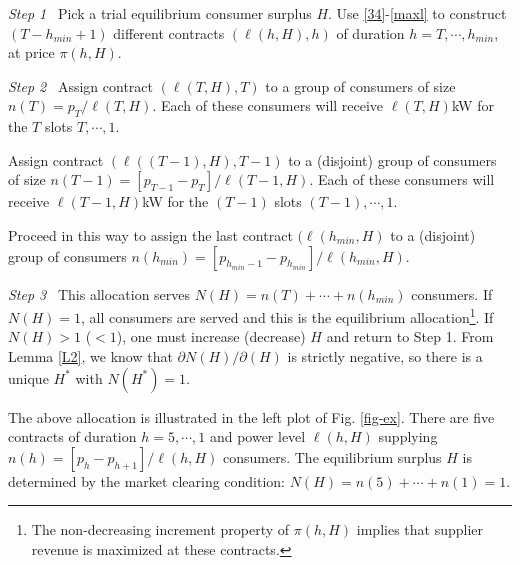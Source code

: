 \documentclass[10pt,draftcls,onecolumn]{IEEEtran}
\newcounter{l1}
\newcounter{l2}
\newcounter{l3}
\renewcommand{\hm}{h_{min}}
\begin{document}
\textit{Step 1} \
Pick a trial equilibrium consumer surplus $H$.  Use \eqref{34}-\eqref{maxl} to   construct $(T-\hm +1)$ different contracts $(\ell (h, H), h)$ of duration $h=T, \cdots, \hm$, at price $\pi (h,H)$.

\textit{Step 2} \
Assign contract $(\ell (T, H), T)$ to a group of consumers of size $n(T) = p_T / \ell(T,H)$.  Each of these consumers will receive $\ell (T,H)$kW
for the $T$ slots $T, \cdots, 1$.

Assign contract $(\ell( (T-1),H),T-1)$ to a (disjoint) group of consumers of size $n(T-1) = [p_{T-1} -p_T]/\ell(T-1, H)$.  Each of these consumers will receive $\ell (T-1,H)$kW
for the $(T-1)$ slots $(T-1), \cdots, 1$.

Proceed in this way to assign the last contract $(\ell(\hm, H)$ to a (disjoint) group of consumers $n(\hm) = [p_{\hm -1} - p_{\hm }]
/\ell (\hm, H)$.

\textit{Step 3}  \ This allocation serves $N(H) = n(T) + \cdots + n(\hm)$ consumers.  If $N(H) = 1$, all consumers are served and this
is the equilibrium allocation\footnote{The non-decreasing increment property of $\pi(h,H)$ implies that supplier revenue is maximized at these contracts.}.  If $N(H) > 1$ ($< 1$), one must increase (decrease) $H$ and return to Step 1.  From Lemma \ref{L2},
we know that $\partial N(H) /\partial (H) $ is strictly negative, so there is a unique $H^*$ with $N(H^*) = 1$.


The above allocation is illustrated in the  left plot of Fig. \ref{fig-ex}. There are five contracts of duration $h = 5, \cdots, 1$ and
power level $\ell(h, H) $ supplying $n(h) = [p_{h}-p_{h+1}]/\ell(h, H) $ consumers.  The equilibrium surplus $H$ is determined by the market
clearing condition: $N(H)=n(5) + \cdots + n(1) = 1$.
\end{document}
